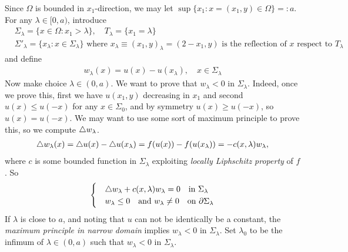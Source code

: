 \documentclass[12pt,a4paper]{article}
\newenvironment{proof}
{\begin{changemargin}{0.5cm}{0.5cm} 
	}%
	{\end{changemargin}
}
\newenvironment{p}
{\begin{proof} 
	}%
	{\end{proof}
}
\begin{document}
\begin{p}
\pf Since $\Omega$ is bounded in $x_1$-direction, we may let $\sup \{x_1 : x= (x_1, y) \in\Omega \} =: a$. For any $\lambda \in [0, a)$, introduce
\begin{align*}
& \Sigma_{\lambda} = \{x\in \Omega : x_1 > \lambda \}, \quad T_{\lambda} = \{x_1 = \lambda \}\\
& \Sigma'_{\lambda} = \{ x_{\lambda} : x \in \Sigma_{\lambda} \} \,\, \text{where } x_{\lambda} \equiv (x_1, y)_{\lambda} = (2-x_1, y) \text{ is the reflection of } x \text{ respect to } T_{\lambda}
\end{align*}
and define 
\begin{align*}
w_{\lambda}(x) = u(x) - u(x_{\lambda}), \quad x\in \Sigma_{\lambda}
\end{align*}
Now make choice $\lambda \in (0, a)$. We want to prove that $w_{\lambda}<0$ in $\Sigma_{\lambda}$. Indeed, once we prove this, first we have $u(x_1, y)$ decreasing in $x_1$ and second $u(x) \leq u(-x)$ for any $x\in \Sigma_{0}$, and by symmetry $u(x) \geq u(-x)$, so $u(x) = u(-x)$. We may want to use some sort of maximum principle to prove this, so we compute $\triangle w_{\lambda}$.
\begin{align*}
\triangle w_{\lambda}(x) = \triangle u(x) - \triangle u(x_{\lambda}) = f(u(x))- f(u(x_{\lambda})) = -c(x,\lambda) w_{\lambda},
\end{align*}
where $c$ is some bounded function in $\Sigma_{\lambda}$ exploiting \emph{locally Liphschitz property} of $f$. So
\begin{align*}
\begin{cases}
& \triangle w_{\lambda} + c(x, \lambda)w_{\lambda} =0 \quad \text{in } \Sigma_{\lambda} \\
& w_{\lambda} \leq 0 \quad \text{and } w_{\lambda} \neq 0 \quad \text{on } \partial \Sigma_{\lambda}
\end{cases}
\end{align*}
If $\lambda$ is close to $a$, and noting that $u$ can not be identically be a constant, the \emph{maximum principle in narrow domain} implies $w_{\lambda}<0$ in $\Sigma_{\lambda}$. Set $\lambda_0$ to be the infimum of $\lambda \in (0, a)$ such that $w_{\lambda}<0$ in $\Sigma_{\lambda}$.


\end{p}
\end{document}
